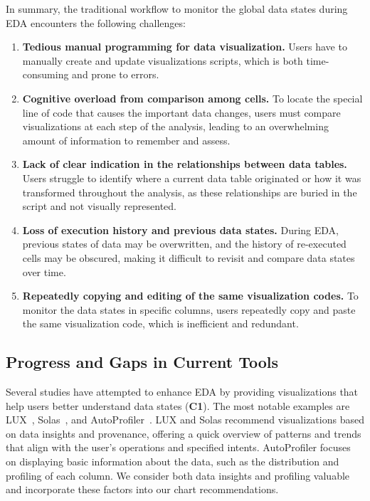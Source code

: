 In summary, the traditional workflow to monitor the global data states during EDA encounters the following challenges:
\begin{enumerate}[label={\textbf{C\arabic*.}}]

\item \textbf{Tedious manual programming for data visualization. } Users have to manually create and update visualizations scripts, which is both time-consuming and prone to errors.

\item \textbf{Cognitive overload from comparison among cells.} To locate the special line of code that causes the important data changes, users must compare visualizations at each step of the analysis, leading to an overwhelming amount of information to remember and assess.

\item \textbf{Lack of clear indication in the relationships between data tables.} Users struggle to identify where a current data table originated or how it was transformed throughout the analysis, as these relationships are buried in the script and not visually represented.

\item \textbf{Loss of execution history and previous data states.} During EDA, previous states of data may be overwritten, and the history of re-executed cells may be obscured, making it difficult to revisit and compare data states over time.

\item \textbf{Repeatedly copying and editing of the same visualization codes.} To monitor the data states in specific columns, users repeatedly copy and paste the same visualization code, which is inefficient and redundant.

\end{enumerate}

\subsection{Progress and Gaps in Current Tools}
Several studies have attempted to enhance EDA by providing visualizations that help users better understand data states (\textbf{C1}). 
The most notable examples are LUX~\cite{lee2021lux}, Solas~\cite{epperson2022leveraging}, and AutoProfiler~\cite{autoprofiler}.
LUX and Solas recommend visualizations based on data insights and provenance, offering a quick overview of patterns and trends that align with the user's operations and specified intents. 
AutoProfiler focuses on displaying basic information about the data, such as the distribution and profiling of each column. 
We consider both data insights and profiling valuable and incorporate these factors into our chart recommendations.

